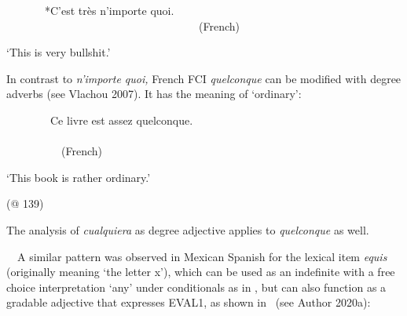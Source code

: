 \begin{listWWNumxleveli}
\item 
\begin{styleListParagraph}
\textmd{\ \ \ \ \ \ \ *C’est très n’importe quoi. \ \ \ \  \ \ \ \ \ \ \ \ \ \ \ \ \ \ \ \ \ \ \ \ \ \ \ \ \ \ \ \ \ \ \ (French)}
\end{styleListParagraph}
\end{listWWNumxleveli}
\begin{styleListParagraph}
\textmd{‘This is very bullshit.’}
\end{styleListParagraph}

\begin{styleStandard}
In contrast to \textit{n’importe quoi,} French FCI \textit{quelconque} can be modified with degree adverbs (see Vlachou 2007). It has the meaning of ‘ordinary’:
\end{styleStandard}

\begin{listWWNumxleveli}
\item 
\begin{styleListParagraph}
\textmd{\ \ \ \ \ \ \ \ Ce livre est assez quelconque. \ \ \ \ \ \ \ \ \ \ \ \ \ \ \ \ \ \ \ \ \ \ \ \ \ \ \ \ \ \ \ \ \ \ \ \ \ \ \ \ \ \ \ \ \ \ \ \ \ \ \ \ \ \ \ \ \ \ \ \ \ \ \ \ \ \ \ \ \ \ \ \ \ \ \ \ \ \ \ \ \ \ (French)}
\end{styleListParagraph}
\end{listWWNumxleveli}
\begin{styleListParagraph}
\textmd{‘This book is rather ordinary.’}
\end{styleListParagraph}

\begin{styleListParagraph}
\textmd{(@ 139)}
\end{styleListParagraph}

\begin{styleStandard}
The analysis of \textit{cualquiera} as degree adjective applies to \textit{quelconque} as well.
\end{styleStandard}

\begin{styleStandard}
\ \ A similar pattern was observed in Mexican Spanish for the lexical item \textit{equis} (originally meaning ‘the letter x’), which can be used as an indefinite with a free choice interpretation ‘any’ under conditionals as in , but can also function as a gradable adjective that expresses EVAL1, as shown in \ (see Author 2020a):
\end{styleStandard}

